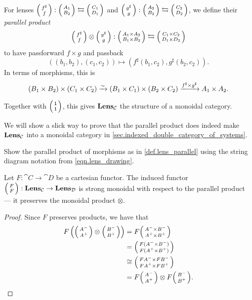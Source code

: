 \documentclass[DynamicalBook]{subfiles}
\begin{document}
\begin{definition}\label{def.lens_parallel}
  For lenses $\lens{f^{\sharp}}{f} : \lens{A_1}{B_2} \leftrightarrows \lens{C_1}{D_1}$ and
  $\lens{g^{\sharp}}{g} : \lens{A_2}{B_2} \leftrightarrows \lens{C_2}{D_2}$, we
  define their \emph{parallel product} $$\lens{f^{\sharp}}{f} \otimes
  \lens{g^{\sharp}}{g} : \lens{A_1 \times A_2}{B_1 \times B_2} \leftrightarrows
  \lens{C_1 \times C_2}{D_1 \times D_2}$$
  to have passforward $f \times g$ and passback
  $$((b_1, b_2), (c_1, c_2)) \mapsto (f^{\sharp}(b_1, c_2), g^{\sharp}(b_2, c_2)).$$
  In terms of morphisms, this is
  $$(B_1 \times B_2) \times (C_1 \times C_2) \xrightarrow{\sim} (B_1 \times C_1) \times
  (B_2 \times C_2) \xrightarrow{f^{\sharp} \times g^{\sharp}} A_1 \times A_2.$$

  Together with $\lens{\ord{1}}{\ord{1}}$, this gives $\textbf{Lens}_{\mathcal{C}}$ the
  structure of a monoidal category.
\end{definition}

\begin{remark}
  We will show a slick way to prove that the parallel product does indeed make
  $\textbf{Lens}_{\mathcal{C}}$ into a monoidal category in \cref{sec.indexed_double_category_of_systems}.
\end{remark}

\begin{exercise}
Show the parallel product of morphisms as in \cref{def.lens_parallel} using the string diagram notation from \eqref{eqn.lens_drawing}.
\end{exercise}


\begin{proposition}\label{prop.lens_functoriality_monoidal}
Let $F : \cat{C} \to \cat{D}$ be a cartesian functor. The induced functor
$\lens{F}{F} : \Cat{Lens}_{\cat{C}} \to \Cat{Lens}_{\cat{D}}$ is strong monoidal
with respect to the parallel product --- it preserves the monoidal product $\otimes$.
\end{proposition}
\begin{proof}
  Since $F$ preserves products, we have that
  \begin{align*}
    F\left(\lens{A^{-}}{A^{+}}\otimes \lens{B^{-}}{B^{+}}\right) &= F\lens{A^{-} \times B^{-}}{A^{+} \times B^{+}} \\
                                                                 &= \lens{F(A^{-} \times B^{-})}{F(A^{+} \times B^{+})} \\
                                                                 &\cong  \lens{FA^{-} \times FB^{-}}{FA^{+} \times FB^{+}} \\
    &= F\lens{A^{-}}{A^{+}} \otimes F\lens{B^{-}}{B^{+}}.
    \end{align*}
\end{proof}
\end{document}
